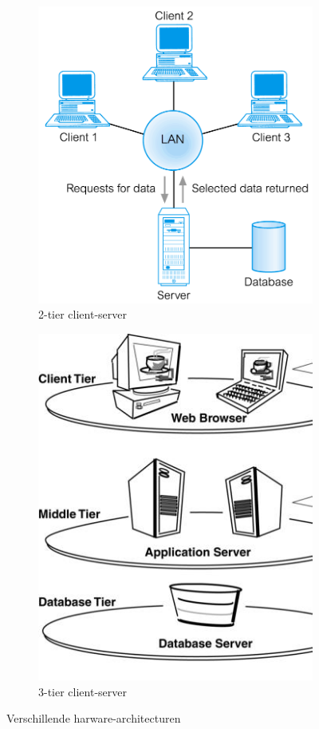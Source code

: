 \documentclass[a4paper,12pt]{article}
\begin{document}
\begin{figure}[H]
\begin{subfigure}{.49\textwidth}
\end{subfigure}
\begin{subfigure}{.49\textwidth}
  \centering
  \includegraphics[width=.9\linewidth]{img/Tier2Server.png}
  \caption{2-tier client-server}
  \label{fig:Tier2Server}
\end{subfigure}
\begin{subfigure}{.49\textwidth}
  \centering
  \includegraphics[width=.9\linewidth]{img/Tier3Server.png}
  \caption{3-tier client-server}
  \label{fig:Tier3Server}
\end{subfigure}
\caption{Verschillende harware-architecturen}
\label{fig:HardwareArchitecturen}
\end{figure}
\end{document}
